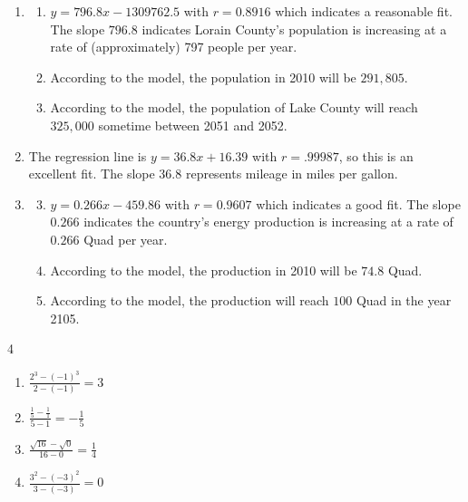 \documentclass{ximera}
\begin{document}
\begin{enumerate}
\item  \begin{enumerate}


\item  $y = 796.8x - 1309762.5$ with $r=0.8916$ which indicates a reasonable fit.  The slope $796.8$ indicates Lorain County's population is increasing at a rate of (approximately) 797 people per year.

\item  According to the model, the population in 2010 will be $291, \! 805$.

\item  According to the model, the population of Lake County will reach $325,\!000$ sometime between 2051 and 2052.

\end{enumerate}

\item The regression line is $y = 36.8x + 16.39$ with  $r = .99987$, so this is an excellent fit.  The slope $36.8$ represents mileage in miles per gallon.

\item \begin{enumerate}

\setcounter{enumii}{2}

\item $y = 0.266x - 459.86$ with $r = 0.9607$ which indicates a good fit.  The slope $0.266$ indicates the country's energy production is increasing at a rate of $0.266$ Quad per year.

\item According to the model, the production in 2010 will be $74.8$ Quad.

\item According to the model, the production will reach $100$ Quad in the year 2105.



\end{enumerate}



\setcounter{HW}{\value{enumi}}
\end{enumerate}

\vspace{-0.1in}

\begin{multicols}{4}
\begin{enumerate}
\setcounter{enumi}{\value{HW}}

\item $\frac{2^{3} - (-1)^{3}}{2 - (-1)} = 3$
\item $\frac{\frac{1}{5} - \frac{1}{1}}{5 - 1} = -\frac{1}{5}$




\item $\frac{\sqrt{16} - \sqrt{0}}{16 - 0} = \frac{1}{4}$
\item $\frac{3^{2} - (-3)^{2}}{3 - (-3)} = 0$

\setcounter{HW}{\value{enumi}}
\end{enumerate}
\end{multicols}
\end{document}
